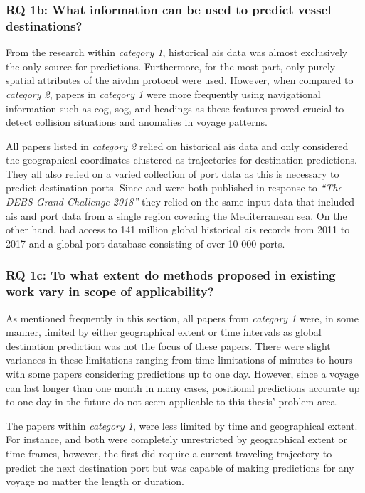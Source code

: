 \subsubsection{RQ 1b: What information can be used to predict vessel destinations?}

From the research within \textit{category 1}, historical \acrshort{ais} data was almost exclusively the only source for predictions. Furthermore, for the most part, only purely spatial attributes of the \gls{aivdm} protocol were used. However, when compared to \textit{category 2}, papers in \textit{category 1} were more frequently using navigational information such as \acrshort{cog}, \acrshort{sog}, and headings as these features proved crucial to detect collision situations and anomalies in voyage patterns.

All papers listed in \textit{category 2} relied on historical \acrshort{ais} data and only considered the geographical coordinates clustered as trajectories for destination predictions. They all also relied on a varied collection of port data as this is necessary to predict destination ports. Since \cite{Rosca2018GrandRoutes} and \cite{Bachar2018GrandDestination} were both published in response to \textit{``The DEBS Grand Challenge 2018''} they relied on the same input data that included \acrshort{ais} and port data from a single region covering the Mediterranean sea. On the other hand, \cite{Zhang2020AISApproach} had access to 141 million global historical \acrshort{ais} records from 2011 to 2017 and a global port database consisting of over 10 000 ports.

\subsubsection{RQ 1c: To what extent do methods proposed in existing work vary in scope of applicability?}

As mentioned frequently in this section, all papers from \textit{category 1} were, in some manner, limited by either geographical extent or time intervals as global destination prediction was not the focus of these papers. There were slight variances in these limitations ranging from time limitations of minutes to hours with some papers considering predictions up to one day. However, since a voyage can last longer than one month in many cases, positional predictions accurate up to one day in the future do not seem applicable to this thesis' problem area.

The papers within \textit{category 1}, were less limited by time and geographical extent. For instance, \cite{Zhang2020AISApproach} and \cite{lechtenberg2019} both were completely unrestricted by geographical extent or time frames, however, the first did require a current traveling trajectory to predict the next destination port but was capable of making predictions for any voyage no matter the length or duration.


